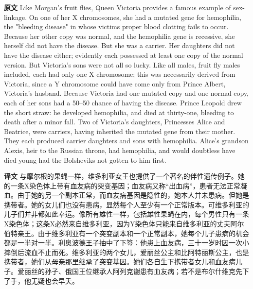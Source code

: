 \documentclass[UTF8,zihao=-4]{ctexart}
\newcommand{\BodyFont}{\fontsize{10.5pt}{15.5pt}\selectfont}
\renewenvironment{quote}{\par\noindent\begingroup\BodyFont}{\par\endgroup}
\begin{document}
\begin{quote}
\noindent\textbf{原文} Like Morgan's fruit flies, Queen Victoria provides a famous example of sex-linkage. On one of her X chromosomes, she had a mutated gene for hemophilia, the "bleeding disease" in whose victims proper blood clotting fails to occur. Because her other copy was normal, and the hemophilia gene is recessive, she herself did not have the disease. But she was a carrier. Her daughters did not have the disease either; evidently each possessed at least one copy of the normal version. But Victoria's sons were not all so lucky. Like all males, fruit fly males included, each had only one X chromosome; this was necessarily derived from Victoria, since a Y chromosome could have come only from Prince Albert, Victoria's husband. Because Victoria had one mutated copy and one normal copy, each of her sons had a 50--50 chance of having the disease. Prince Leopold drew the short straw: he developed hemophilia, and died at thirty-one, bleeding to death after a minor fall. Two of Victoria's daughters, Princesses Alice and Beatrice, were carriers, having inherited the mutated gene from their mother. They each produced carrier daughters and sons with hemophilia. Alice's grandson Alexis, heir to the Russian throne, had hemophilia, and would doubtless have died young had the Bolsheviks not gotten to him first.

\smallskip
\noindent\textbf{译文} 与摩尔根的果蝇一样，维多利亚女王也提供了一个著名的伴性遗传例子。她的一条X染色体上带有血友病的突变基因；血友病又称“出血病”，患者无法正常凝血。由于她的另一个副本正常，而血友病基因是隐性的，她本人并未患病。但她是携带者。她的女儿们也没有患病，显然每个人至少有一个正常版本。可维多利亚的儿子们并非都如此幸运。像所有雄性一样，包括雄性果蝇在内，每个男性只有一条X染色体；这条X必然来自维多利亚，因为Y染色体只能来自维多利亚的丈夫阿尔伯特亲王。由于维多利亚有一个突变副本和一个正常副本，她每个儿子患病的机会都是一半对一半。利奥波德王子抽中了下签：他患上血友病，三十一岁时因一次小摔倒后流血不止而死。维多利亚的两个女儿，爱丽丝公主和比阿特丽斯公主，也是携带者，她们从母亲那里继承了突变基因。她们各自生下携带者女儿和血友病儿子。爱丽丝的孙子、俄国王位继承人阿列克谢患有血友病；若不是布尔什维克先下了手，他无疑也会早夭。
\end{quote}
\end{document}
